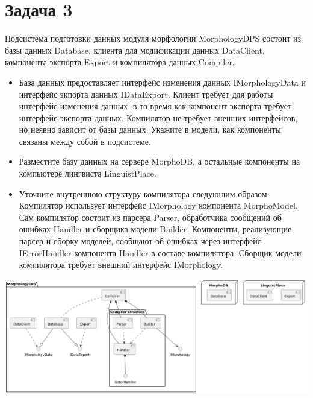 \documentclass{article}
\begin{document}
\section{Задача 3}
Подсистема подготовки данных модуля морфологии MorphologyDPS состоит из базы данных Database, клиента для модификации данных DataClient, компонента экспорта Export и компилятора данных Compiler.
\begin{itemize}
    \item База данных предоставляет интерфейс изменения данных IMorphologyData и интерфейс экпорта данных IDataExport. Клиент требует для работы интерфейс изменения данных, в то время как компонент экспорта требует интерфейс экспорта данных. Компилятор не требует внешних интерфейсов, но неявно зависит от базы данных. Укажите в модели, как компоненты связаны между собой в подсистеме.
    \item Разместите базу данных на сервере MorphoDB, а остальные компоненты на компьютере лингвиста LinguistPlace.
    \item Уточните внутреннюю структуру компилятора следующим образом. Компилятор использует интерфейс IMorphology компонента MorphoModel. Сам компилятор состоит из парсера Parser, обработчика сообщений об ошибках Handler и сборщика модели Builder. Компоненты, реализующие парсер и сборку моделей, сообщают об ошибках через интерфейс IErrorHandler компонента Handler в составе компилятора. Сборщик модели компилятора требует внешний интерфейс IMorphology.
\end{itemize}

\includegraphics[width=\textwidth]{3.png}
\end{document}
